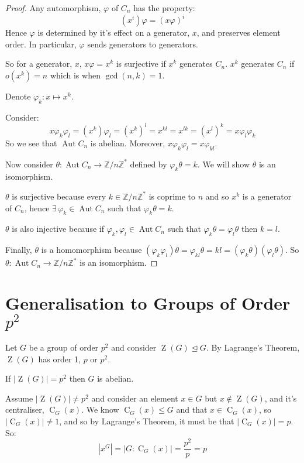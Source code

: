 \documentclass[a4paper, oneside, 12pt, final]{article}
\theoremstyle{definition}
\DeclareMathOperator{\Aut}{Aut}
\DeclareMathOperator{\z}{Z}
\DeclareMathOperator{\C}{C}
\newcommand{\Z}{\mathbb{Z}}
\newcommand{\Zn}[1]{\Z/#1\Z}
\begin{document}
\begin{proof}
    Any automorphism, \(\varphi\) of \(C_n\) has the property:
    \[(x^i)\varphi = (x\varphi)^i\]
    Hence \(\varphi\) is determined by it's effect on a generator, \(x\), and
    preserves element order.
    In particular, \(\varphi\) sends generators to generators.

    So for a generator, \(x\), \(x\varphi = x^k\) is surjective if \(x^k\)
    generates \(C_n\).
    \(x^k\) generates \(C_n\) if \(o(x^k) = n\) which is when \(\gcd{(n, k)} =
    1\).

    Denote \(\varphi_k:x \mapsto x^k\).

    Consider:
    \[x\varphi_k\varphi_l = (x^k)\varphi_l = (x^k)^l = x^{kl} = x^{lk} =
    (x^l)^k = x\varphi_l\varphi_k\]
    So we see that \(\Aut{C_n}\) is abelian.
    Moreover, \(x\varphi_k\varphi_l = x\varphi_{kl}\).

    Now consider \(\theta:\Aut{C_n} \to \Zn{n}^*\) defined by \(\varphi_k\theta
    = k\).
    We will show \(\theta\) is an isomorphism.

    \(\theta\) is surjective because every \(k \in \Zn{n}^*\) is coprime to
    \(n\) and so \(x^k\) is a generator of \(C_n\), hence \(\exists\,\varphi_k
    \in \Aut{C_n}\) such that \(\varphi_k\theta = k\).

    \(\theta\) is also injective because if \(\varphi_k, \varphi_l \in
    \Aut{C_n}\) such that \(\varphi_k\theta = \varphi_l\theta\) then \(k = l\).

    Finally, \(\theta\) is a homomorphism because \((\varphi_k\varphi_l)\theta =
    \varphi_{kl}\theta = kl = (\varphi_k\theta)(\varphi_l\theta)\).
    So \(\theta:\Aut{C_n} \to \Zn{n}^*\) is an isomorphism.

\end{proof}

\section{Generalisation to Groups of Order \(p^2\)}
Let \(G\) be a group of order \(p^2\) and consider \(\z{(G)} \unlhd G\).
By Lagrange's Theorem, \(\z{(G)}\) has order 1, \(p\) or \(p^2\).

If \(|\z{(G)}| = p^2\) then \(G\) is abelian.

Assume \(|\z{(G)}| \neq p^2\) and consider an element \(x \in G\) but \(x \notin \z{(G)}\), and it's centraliser, \(\C_G{(x)}\).
We know \(\C_G{(x)} \leqslant G\) and that \(x \in \C_G{(x)}\), so \(|\C_G{(x)| \neq 1}\), and so by Lagrange's Theorem, it must be that \(|\C_G{(x)}| = p\).
So:
\[|x^G| = |G:\C_G{(x)}| = \frac{p^2}{p} = p\]
\end{document}
